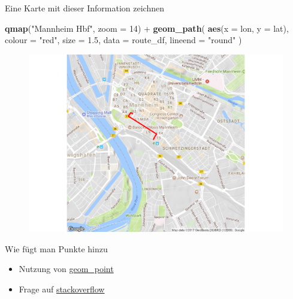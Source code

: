 \documentclass[ignorenonframetext,]{beamer}
\newenvironment{Shaded}{}{}
\newcommand{\KeywordTok}[1]{\textcolor[rgb]{0.00,0.44,0.13}{\textbf{{#1}}}}
\newcommand{\DataTypeTok}[1]{\textcolor[rgb]{0.56,0.13,0.00}{{#1}}}
\newcommand{\DecValTok}[1]{\textcolor[rgb]{0.25,0.63,0.44}{{#1}}}
\newcommand{\FloatTok}[1]{\textcolor[rgb]{0.25,0.63,0.44}{{#1}}}
\newcommand{\StringTok}[1]{\textcolor[rgb]{0.25,0.44,0.63}{{#1}}}
\newcommand{\NormalTok}[1]{{#1}}
\begin{document}
\begin{frame}[fragile]{Eine Karte mit dieser Information zeichnen}

\begin{Shaded}
\begin{Highlighting}[]
\KeywordTok{qmap}\NormalTok{(}\StringTok{"Mannheim Hbf"}\NormalTok{, }\DataTypeTok{zoom =} \DecValTok{14}\NormalTok{) +}
\StringTok{  }\KeywordTok{geom_path}\NormalTok{(}
    \KeywordTok{aes}\NormalTok{(}\DataTypeTok{x =} \NormalTok{lon, }\DataTypeTok{y =} \NormalTok{lat),  }\DataTypeTok{colour =} \StringTok{"red"}\NormalTok{, }\DataTypeTok{size =} \FloatTok{1.5}\NormalTok{,}
    \DataTypeTok{data =} \NormalTok{route_df, }\DataTypeTok{lineend =} \StringTok{"round"}
  \NormalTok{)}
\end{Highlighting}
\end{Shaded}

\begin{figure}[htbp]
\centering
\includegraphics{RSocialScience2_files/figure-beamer/unnamed-chunk-60-1.pdf}
\caption{}
\end{figure}

Wie fügt man Punkte hinzu

\begin{itemize}
\item
  Nutzung von
  \href{http://zevross.com/blog/2014/07/16/mapping-in-r-using-the-ggplot2-package/}{geom\_point}
\item
  Frage auf
  \href{http://stackoverflow.com/questions/15069963/getting-a-map-with-points-using-ggmap-and-ggplot2}{stackoverflow}
\end{itemize}

\end{frame}
\end{document}
